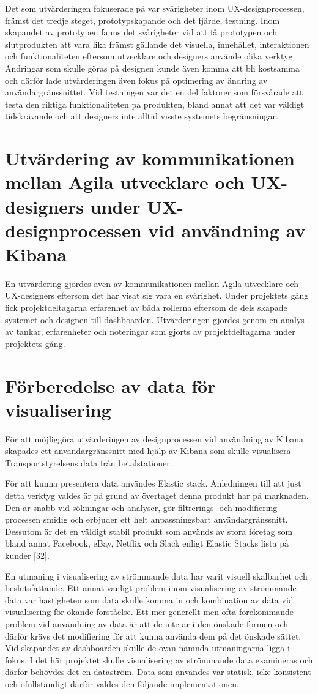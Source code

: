 \documentclass[12pt]{kththesis}
\begin{document}
Det som utvärderingen fokuserade på var svårigheter inom UX-designprocessen, främst det tredje steget, prototypskapande och det fjärde, testning. Inom skapandet av prototypen fanns det svårigheter vid att få prototypen och slutprodukten att vara lika främst gällande det visuella, innehållet, interaktionen och funktionaliteten eftersom utvecklare och designers använde olika verktyg. Ändringar som skulle göras på designen kunde även komma att bli kostsamma och därför lade utvärderingen även fokus på optimering av ändring av användargränssnittet. Vid testningen var det en del faktorer som försvårade att testa den riktiga funktionaliteten på produkten, bland annat att det var väldigt tidskrävande och att designers inte alltid visste systemets begränsningar. 

\section{Utvärdering av kommunikationen mellan Agila utvecklare och UX-designers under UX-designprocessen vid användning av Kibana}

En utvärdering gjordes även av kommunikationen mellan Agila utvecklare och UX-designers eftersom det har visat sig vara en svårighet. Under projektets gång fick projektdeltagarna erfarenhet av båda rollerna eftersom de dels skapade systemet och designen till dashboarden. Utvärderingen gjordes genom en analys av tankar, erfarenheter och noteringar som gjorts av projektdeltagarna under projektets gång. 


\section{Förberedelse av data för visualisering}

För att möjliggöra utvärderingen av designprocessen vid användning av Kibana skapades ett användargränssnitt med hjälp av Kibana som skulle visualisera Transportstyrelsens data från betalstationer.

För att kunna presentera data användes Elastic stack. Anledningen till att just detta verktyg valdes är på grund av övertaget denna produkt har på marknaden. Den är snabb vid sökningar och analyser, gör filtrerings- och modifiering processen smidig och erbjuder ett helt anpassningsbart användargränssnitt. Dessutom är det en väldigt stabil produkt som används av stora företag som bland annat Facebook, eBay, Netflix och Slack enligt Elastic Stacks lista på kunder [32]. 

En utmaning i visualisering av strömmande data har varit visuell skalbarhet och beslutsfattande. Ett annat vanligt problem inom visualisering av strömmande data var hastigheten som data skulle komma in och kombination av data vid visualisering för ökande förståelse.  Ett mer generellt men ofta förekommande problem vid användning av data är att de inte är i den önskade formen och därför krävs det modifiering för att kunna använda dem på det önskade sättet. Vid skapandet av dashboarden skulle de ovan nämnda utmaningarna ligga i fokus. I det här projektet skulle visualisering av strömmande data examineras och därför behövdes det en dataström. Data som användes var statisk, icke konsistent och ofullständigt därför valdes den följande implementationen.
\end{document}
